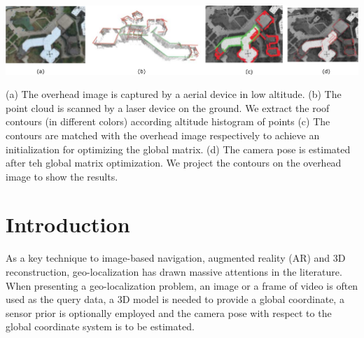 \documentclass[sigconf,authorversion]{acmart}
\begin{document}



\begin{teaserfigure}
  \includegraphics[width=\textwidth]{figures/teaser_pdf}
  \caption{(a) The overhead image is captured by a aerial device in low altitude. (b) The point cloud is scanned by a laser device on the ground. We extract the roof contours (in different colors) according altitude histogram of points (c) The contours are matched with the overhead image respectively to achieve an initialization for optimizing the global matrix. (d) The camera pose is estimated after teh global matrix optimization. We project the contours on the overhead image to show the results.}
  \label{fig:teaser}
\end{teaserfigure}


\maketitle



\section{Introduction}
%
As a key technique to image-based navigation, augmented reality (AR) and 3D reconstruction, geo-localization has drawn massive attentions in the literature. When presenting a geo-localization problem, an image or a frame of video is often used as the query data, a 3D model is needed to provide a global coordinate, a sensor prior is optionally employed and the camera pose with respect to the global coordinate system is to be estimated. 
\end{document}
